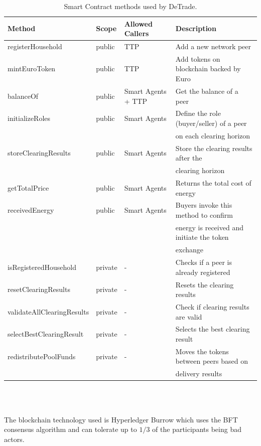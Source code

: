 \begin{table}[h!]
    \begin{tabular}{l|lll}
        Method                     & Scope   & Allowed Callers    & Description                               \\ \hline
        registerHousehold          & public  & TTP                & Add a new network peer                    \\
        mintEuroToken              & public  & TTP                & Add tokens on blockchain backed by Euro   \\
        balanceOf                  & public  & Smart Agents + TTP & Get the balance of a peer                 \\
        initializeRoles            & public  & Smart Agents       & Define the role (buyer/seller) of a peer  \\
                                   &         &                    & on each clearing horizon                  \\
        storeClearingResults       & public  & Smart Agents       & Store the clearing results after the      \\
                                   &         &                    & clearing horizon                          \\
        getTotalPrice              & public  & Smart Agents       & Returns the total cost of energy          \\
        receivedEnergy             & public  & Smart Agents       & Buyers invoke this method to confirm      \\
                                   &         &                    & energy is received and initiate the token \\
                                   &         &                    & exchange                                  \\
        isRegisteredHousehold      & private & -                  & Checks if a peer is already registered    \\
        resetClearingResults       & private & -                  & Resets the clearing results               \\
        validateAllClearingResults & private & -                  & Check if clearing results are valid       \\
        selectBestClearingResult   & private & -                  & Selects the best clearing result          \\
        redistributePoolFunds      & private & -                  & Moves the tokens between peers based on   \\
                                   &         &                    & delivery results
    \end{tabular}\\
    \caption{Smart Contract methods used by DeTrade.}
\end{table}
\\The blockchain technology used is Hyperledger Burrow which uses the BFT consensus algorithm and can tolerate up to $1/3$ of the participants being bad actors.
\cite{DeTrade}

